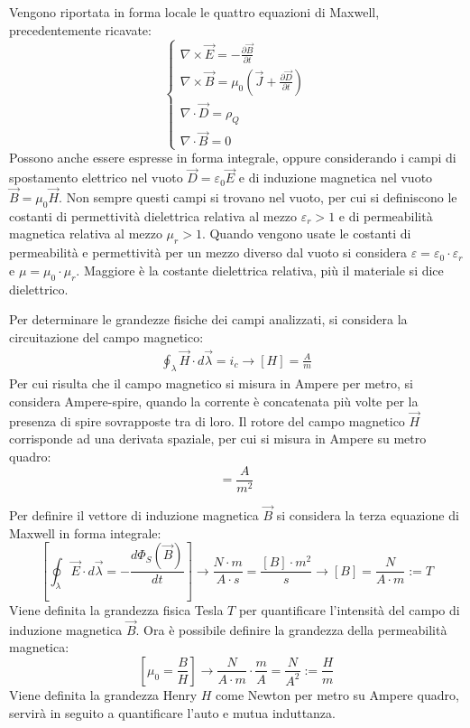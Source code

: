 \documentclass{article}
\numberwithin{equation}{subsection}
\begin{document}
Vengono riportata in forma locale le quattro equazioni di Maxwell, precedentemente ricavate:
\begin{equation*}
    \begin{cases}
        \nabla\times\vec{E}=-\displaystyle\frac{\partial \vec{B}}{\partial t}\\
        \nabla\times\vec{B}=\mu_0\left(\vec{J}+\displaystyle\frac{\partial \vec{D}}{\partial t}\right)\\
        \nabla\cdot\vec{D}=\rho_Q\\
        \nabla\cdot\vec{B}=0
    \end{cases}
\end{equation*}
Possono anche essere espresse in forma integrale, oppure considerando i campi di spostamento elettrico nel vuoto $\vec{D}=\varepsilon_0\vec{E}$ e di induzione magnetica nel 
vuoto $\vec{B}=\mu_0\vec{H}$. Non sempre questi campi si trovano nel vuoto, per cui si definiscono le costanti di permettività dielettrica relativa al mezzo $\varepsilon_r>1$ 
e di permeabilità magnetica relativa al mezzo $\mu_r>1$. Quando vengono usate le costanti di permeabilità e permettività per un mezzo diverso dal vuoto si considera $\varepsilon=\varepsilon_0\cdot\varepsilon_r$ 
e $\mu=\mu_0\cdot\mu_r$. Maggiore è la costante dielettrica relativa, più il materiale si dice dielettrico. 

Per determinare le grandezze fisiche dei campi analizzati, si considera la circuitazione del campo magnetico:
\begin{gather*}
    \displaystyle\oint_{\lambda}\vec{H}\cdot d\vec{\lambda}=i_c\to[H]=\displaystyle\frac{A}{m}
\end{gather*}
Per cui risulta che il campo magnetico si misura in Ampere per 
metro, si considera Ampere-spire, quando la corrente è concatenata più volte per la presenza di spire sovrapposte tra di loro. Il rotore del campo magnetico $\vec{H}$ 
corrisponde ad una derivata spaziale, per cui si misura in Ampere su metro quadro:
\begin{equation*}
    [\nabla\times\vec{H}]=\displaystyle\frac{A}{m^2}
\end{equation*}

Per definire il vettore di induzione magnetica $\vec{B}$ si considera la terza equazione di Maxwell in forma integrale:
\begin{equation*}
    \displaystyle\left[\oint_{\lambda}\vec{E}\cdot d\vec\lambda=-\frac{d\Phi_S(\vec{B})}{dt}\right]\to\frac{N\cdot m}{A\cdot s}=\frac{[B]\cdot m^2}{s}\to[B]=\frac{N}{A\cdot m}:=T
\end{equation*}
Viene definita la grandezza fisica Tesla $T$ per quantificare l'intensità del campo di induzione magnetica $\vec{B}$. Ora è possibile definire la grandezza della permeabilità 
magnetica:
\begin{equation*}
    \displaystyle\left[\mu_0=\frac{{B}}{{H}}\right]\to\frac{N}{A\cdot m}\cdot\frac{m}{A}=\frac{N}{A^2}:=\frac{H}{m}
\end{equation*}
Viene definita la grandezza Henry $H$ come Newton per metro su Ampere quadro, servirà in seguito a quantificare l'auto e mutua induttanza. 
\end{document}

